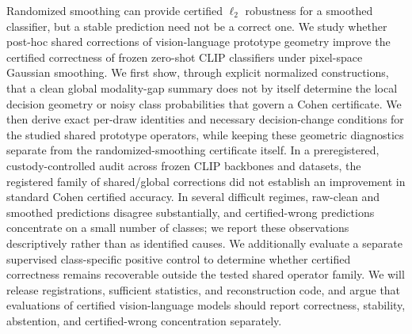 Randomized smoothing can provide certified $\ell_2$ robustness for a smoothed classifier, but a stable prediction need not be a correct one. We study whether post-hoc shared corrections of vision-language prototype geometry improve the certified correctness of frozen zero-shot CLIP classifiers under pixel-space Gaussian smoothing. We first show, through explicit normalized constructions, that a clean global modality-gap summary does not by itself determine the local decision geometry or noisy class probabilities that govern a Cohen certificate. We then derive exact per-draw identities and necessary decision-change conditions for the studied shared prototype operators, while keeping these geometric diagnostics separate from the randomized-smoothing certificate itself. In a preregistered, custody-controlled audit across frozen CLIP backbones and datasets, the registered family of shared/global corrections did not establish an improvement in standard Cohen certified accuracy. In several difficult regimes, raw-clean and smoothed predictions disagree substantially, and certified-wrong predictions concentrate on a small number of classes; we report these observations descriptively rather than as identified causes. We additionally evaluate a separate supervised class-specific positive control to determine whether certified correctness remains recoverable outside the tested shared operator family. We will release registrations, sufficient statistics, and reconstruction code, and argue that evaluations of certified vision-language models should report correctness, stability, abstention, and certified-wrong concentration separately.
